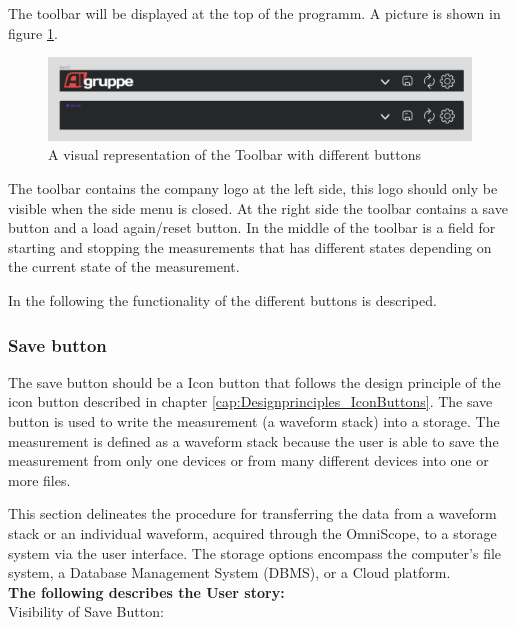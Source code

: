 \documentclass{scrreprt}
\begin{document}
The toolbar will be displayed at the top of the programm. 
A picture is shown in figure \ref{fig: toolbar}. 
\begin{figure}
    \includegraphics[width=.9\textwidth]{assets/pictures/Toolbar states.png}
    \caption[]{A visual representation of the Toolbar with different buttons}
    \label{fig: toolbar}
\end{figure}
The toolbar contains the company logo at the left side, this logo should only be visible when the side menu is closed. 
At the right side the toolbar contains a save button and a load again/reset button. 
In the middle of the toolbar is a field for starting and stopping the measurements that has different states depending on the current state of the measurement. 

In the following the functionality of the different buttons is descriped. 

\subsubsection{Save button}

The save button should be a Icon button that follows the design principle of the icon button described in chapter \ref{cap:Designprinciples_IconButtons}. 
The save button is used to write the measurement (a waveform stack) into a storage. 
The measurement is defined as a waveform stack because the user is able to save the measurement from only one devices or from many different devices into one or more files.

This section delineates the procedure for transferring the data from a waveform stack or an individual waveform, acquired through the OmniScope, to a storage system via the user interface. The storage options encompass the computer's file system, a Database Management System (DBMS), or a Cloud platform.
\\

\textbf{The following describes the User story:} \\

Visibility of Save Button: \\
\end{document}
